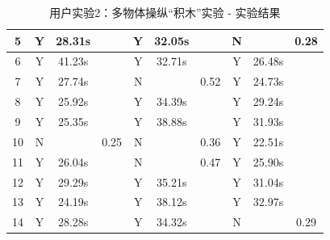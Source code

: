\begin{table}[t!]
\begin{tabular}{|c|ccc|ccc|ccc|}
5 &
  \multicolumn{1}{c|}{Y} &
  \multicolumn{1}{c|}{28.31s} &
   &
  \multicolumn{1}{c|}{Y} &
  \multicolumn{1}{c|}{32.05s} &
   &
  \multicolumn{1}{c|}{N} &
  \multicolumn{1}{c|}{} &
  0.28 \\ \hline
6 &
  \multicolumn{1}{c|}{Y} &
  \multicolumn{1}{c|}{41.23s} &
   &
  \multicolumn{1}{c|}{Y} &
  \multicolumn{1}{c|}{32.71s} &
   &
  \multicolumn{1}{c|}{Y} &
  \multicolumn{1}{c|}{26.48s} &
   \\ \hline
7 &
  \multicolumn{1}{c|}{Y} &
  \multicolumn{1}{c|}{27.74s} &
   &
  \multicolumn{1}{c|}{N} &
  \multicolumn{1}{c|}{} &
  0.52 &
  \multicolumn{1}{c|}{Y} &
  \multicolumn{1}{c|}{24.73s} &
   \\ \hline
8 &
  \multicolumn{1}{c|}{Y} &
  \multicolumn{1}{c|}{25.92s} &
   &
  \multicolumn{1}{c|}{Y} &
  \multicolumn{1}{c|}{34.39s} &
   &
  \multicolumn{1}{c|}{Y} &
  \multicolumn{1}{c|}{29.24s} &
   \\ \hline
9 &
  \multicolumn{1}{c|}{Y} &
  \multicolumn{1}{c|}{25.35s} &
   &
  \multicolumn{1}{c|}{Y} &
  \multicolumn{1}{c|}{38.88s} &
   &
  \multicolumn{1}{c|}{Y} &
  \multicolumn{1}{c|}{31.93s} &
   \\ \hline
10 &
  \multicolumn{1}{c|}{N} &
  \multicolumn{1}{c|}{} &
  0.25 &
  \multicolumn{1}{c|}{N} &
  \multicolumn{1}{c|}{} &
  0.36 &
  \multicolumn{1}{c|}{Y} &
  \multicolumn{1}{c|}{22.51s} &
   \\ \hline
11 &
  \multicolumn{1}{c|}{Y} &
  \multicolumn{1}{c|}{26.04s} &
   &
  \multicolumn{1}{c|}{N} &
  \multicolumn{1}{c|}{} &
  0.47 &
  \multicolumn{1}{c|}{Y} &
  \multicolumn{1}{c|}{25.90s} &
   \\ \hline
12 &
  \multicolumn{1}{c|}{Y} &
  \multicolumn{1}{c|}{29.29s} &
   &
  \multicolumn{1}{c|}{Y} &
  \multicolumn{1}{c|}{35.21s} &
   &
  \multicolumn{1}{c|}{Y} &
  \multicolumn{1}{c|}{31.04s} &
   \\ \hline
13 &
  \multicolumn{1}{c|}{Y} &
  \multicolumn{1}{c|}{24.19s} &
   &
  \multicolumn{1}{c|}{Y} &
  \multicolumn{1}{c|}{38.12s} &
   &
  \multicolumn{1}{c|}{Y} &
  \multicolumn{1}{c|}{32.97s} &
   \\ \hline
14 &
  \multicolumn{1}{c|}{Y} &
  \multicolumn{1}{c|}{28.28s} &
   &
  \multicolumn{1}{c|}{Y} &
  \multicolumn{1}{c|}{34.32s} &
   &
  \multicolumn{1}{c|}{N} &
  \multicolumn{1}{c|}{} &
  0.29 \\ \hline
\end{tabular}
\caption{用户实验2：多物体操纵“积木”实验 - 实验结果}
\label{table-4-5}
\end{table}

